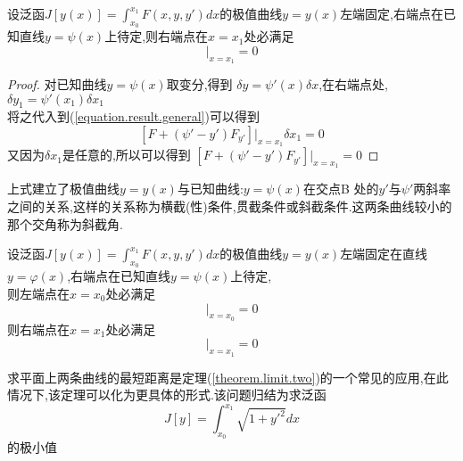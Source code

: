 \documentclass{book}
\begin{document}
\begin{theorem}
设泛函$J[y(x)]=\int_{x_0}^{x_1}F(x,y,y')dx$的极值曲线$y=y(x)$左端固定,右端点在已知直线$y=\psi(x)$上待定,则右端点在$x=x_1$处必满足
\begin{equation}
[F + (\psi' - y')F_{y'}]|_{x=x_1}=0
\end{equation}
\end{theorem}
\begin{proof}
 对已知曲线$y=\psi(x)$取变分,得到 $\delta y=\psi'(x)\delta x$,在右端点处,$\delta y_1=\psi'(x_1)\delta x_1$ \\
将之代入到(\ref{equation.result.general})可以得到
$$ [F + (\psi' - y')F_{y'}]|_{x=x_1}\delta x_1=0 $$
又因为$\delta x_1$是任意的,所以可以得到
$[F + (\psi' - y')F_{y'}]|_{x=x_1}=0$
\end{proof}
上式建立了极值曲线$y = y ( x )$与已知曲线:$y = \psi(x)$在交点B 处的$y'$与$\psi'$两斜率
之间的关系,这样的关系称为横截(性)条件,贯截条件或斜截条件.这两条曲线较小的那个交角称为斜截角.

\begin{theorem}
\label{theorem.limit.two}
设泛函$J[y(x)]=\int_{x_0}^{x_1}F(x,y,y')dx$的极值曲线$y=y(x)$左端固定在直线$y=\varphi(x)$,右端点在已知直线$y=\psi(x)$上待定,\\
则左端点在$x=x_0$处必满足
\begin{equation}
[F + (\varphi' - y')F_{y'}]|_{x=x_0}=0
\end{equation}
则右端点在$x=x_1$处必满足
\begin{equation}
[F + (\psi' - y')F_{y'}]|_{x=x_1}=0
\end{equation}
\end{theorem}
求平面上两条曲线的最短距离是定理(\ref{theorem.limit.two})的一个常见的应用,在此情况下,该定理可以化为更具体的形式.该问题归结为求泛函
$$J[y]=\int_{x_0}^{x_1}\sqrt{1+y'^2}dx$$的极小值
\end{document}
